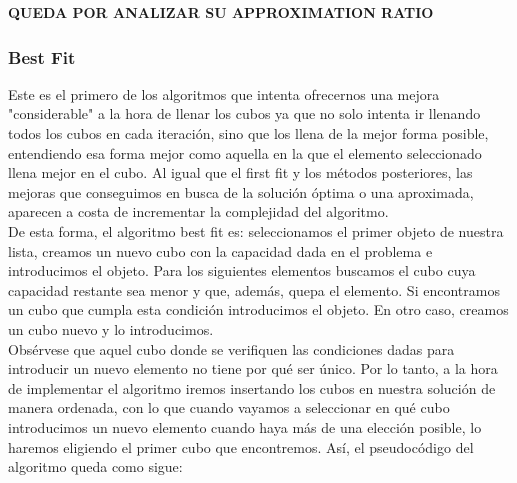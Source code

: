 \documentclass[a4paper, 12pt, oneside]{book}
\begin{document}
	\textbf{QUEDA POR ANALIZAR SU APPROXIMATION RATIO}
	
	\subsubsection{Best Fit}
	Este es el primero de los algoritmos que intenta ofrecernos una mejora "considerable" a la hora de llenar los cubos ya que no solo intenta ir llenando todos los cubos en cada iteraci\'on, sino que los llena de la mejor forma posible, entendiendo esa forma mejor como aquella en la que el elemento seleccionado llena mejor en el cubo. Al igual que el first fit y los m\'etodos posteriores, las mejoras que conseguimos en busca de la soluci\'on \'optima o una aproximada, aparecen a costa de incrementar la complejidad del algoritmo.
	\\
	
	De esta forma, el algoritmo best fit es: seleccionamos el primer objeto de nuestra lista, creamos un nuevo cubo con la capacidad dada en el problema e introducimos el objeto. Para los siguientes elementos buscamos el cubo cuya capacidad restante sea menor y que, adem\'as, quepa el elemento. Si encontramos un cubo que cumpla esta condici\'on introducimos el objeto. En otro caso, creamos un cubo nuevo y lo introducimos.
	\\
	
	Obs\'ervese que aquel cubo donde se verifiquen las condiciones dadas para introducir un nuevo elemento no tiene por qu\'e ser \'unico. Por lo tanto, a la hora de implementar el algoritmo iremos insertando los cubos en nuestra soluci\'on de manera ordenada, con lo que cuando vayamos a seleccionar en qu\'e cubo introducimos un nuevo elemento cuando haya m\'as de una elecci\'on posible, lo haremos eligiendo el primer cubo que encontremos. As\'i, el pseudoc\'odigo del algoritmo queda como sigue: 
	\\
	
\end{document}
